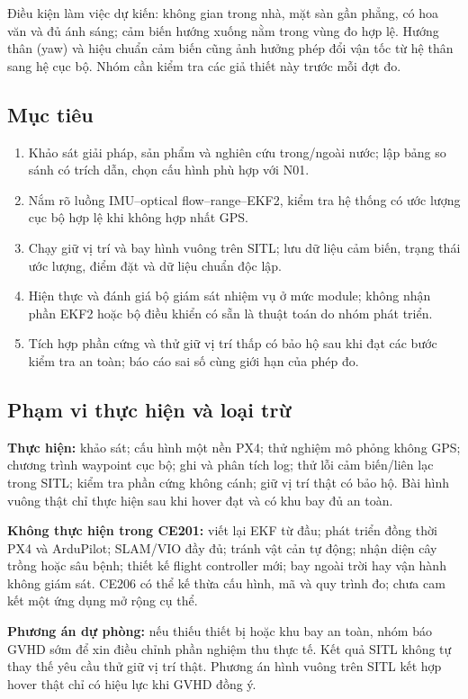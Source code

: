 \documentclass[a4paper,12pt]{article}
\begin{document}
Điều kiện làm việc dự kiến: không gian trong nhà, mặt sàn gần phẳng, có hoa văn và đủ ánh sáng; cảm biến hướng xuống nằm trong vùng đo hợp lệ. Hướng thân (yaw) và hiệu chuẩn cảm biến cũng ảnh hưởng phép đổi vận tốc từ hệ thân sang hệ cục bộ. Nhóm cần kiểm tra các giả thiết này trước mỗi đợt đo.

\subsection{Mục tiêu}
\begin{enumerate}
\item Khảo sát giải pháp, sản phẩm và nghiên cứu trong/ngoài nước; lập bảng so sánh có trích dẫn, chọn cấu hình phù hợp với N01.
\item Nắm rõ luồng IMU--optical flow--range--EKF2, kiểm tra hệ thống có ước lượng cục bộ hợp lệ khi không hợp nhất GPS.
\item Chạy giữ vị trí và bay hình vuông trên SITL; lưu dữ liệu cảm biến, trạng thái ước lượng, điểm đặt và dữ liệu chuẩn độc lập.
\item Hiện thực và đánh giá bộ giám sát nhiệm vụ ở mức module; không nhận phần EKF2 hoặc bộ điều khiển có sẵn là thuật toán do nhóm phát triển.
\item Tích hợp phần cứng và thử giữ vị trí thấp có bảo hộ sau khi đạt các bước kiểm tra an toàn; báo cáo sai số cùng giới hạn của phép đo.
\end{enumerate}

\subsection{Phạm vi thực hiện và loại trừ}
\textbf{Thực hiện:} khảo sát; cấu hình một nền PX4; thử nghiệm mô phỏng không GPS; chương trình waypoint cục bộ; ghi và phân tích log; thử lỗi cảm biến/liên lạc trong SITL; kiểm tra phần cứng không cánh; giữ vị trí thật có bảo hộ. Bài hình vuông thật chỉ thực hiện sau khi hover đạt và có khu bay đủ an toàn.

\textbf{Không thực hiện trong CE201:} viết lại EKF từ đầu; phát triển đồng thời PX4 và ArduPilot; SLAM/VIO đầy đủ; tránh vật cản tự động; nhận diện cây trồng hoặc sâu bệnh; thiết kế flight controller mới; bay ngoài trời hay vận hành không giám sát. CE206 có thể kế thừa cấu hình, mã và quy trình đo; chưa cam kết một ứng dụng mở rộng cụ thể.

\textbf{Phương án dự phòng:} nếu thiếu thiết bị hoặc khu bay an toàn, nhóm báo GVHD sớm để xin điều chỉnh phần nghiệm thu thực tế. Kết quả SITL không tự thay thế yêu cầu thử giữ vị trí thật. Phương án hình vuông trên SITL kết hợp hover thật chỉ có hiệu lực khi GVHD đồng ý.
\end{document}
